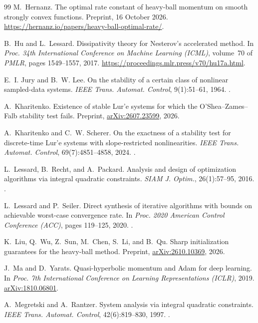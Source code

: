 \documentclass[11pt]{article}
\theoremstyle{definition}
\theoremstyle{remark}
\begin{document}
\begin{thebibliography}{99}
 M.~Hernanz. The optimal rate constant of heavy-ball momentum on smooth strongly convex functions. Preprint, 16 October 2026. \url{https://hernanz.io/papers/heavy-ball-optimal-rate/}.

 B.~Hu and L.~Lessard. Dissipativity theory for Nesterov's accelerated method. In \textit{Proc. 34th International Conference on Machine Learning (ICML)}, volume~70 of \textit{PMLR}, pages 1549--1557, 2017. \url{https://proceedings.mlr.press/v70/hu17a.html}.

 E.~I. Jury and B.~W. Lee. On the stability of a certain class of nonlinear sampled-data systems. \textit{IEEE Trans. Automat. Control}, 9(1):51--61, 1964. .

 A.~Kharitenko. Existence of stable Lur'e systems for which the O'Shea--Zames--Falb stability test fails. Preprint, \href{https://arxiv.org/abs/2607.23599}{arXiv:2607.23599}, 2026.

 A.~Kharitenko and C.~W. Scherer. On the exactness of a stability test for discrete-time Lur'e systems with slope-restricted nonlinearities. \textit{IEEE Trans. Automat. Control}, 69(7):4851--4858, 2024. .

 L.~Lessard, B.~Recht, and A.~Packard. Analysis and design of optimization algorithms via integral quadratic constraints. \textit{SIAM J. Optim.}, 26(1):57--95, 2016. .

 L.~Lessard and P.~Seiler. Direct synthesis of iterative algorithms with bounds on achievable worst-case convergence rate. In \textit{Proc. 2020 American Control Conference (ACC)}, pages 119--125, 2020. .

 K.~Liu, Q.~Wu, Z.~Sun, M.~Chen, S.~Li, and B.~Qu. Sharp initialization guarantees for the heavy-ball method. Preprint, \href{https://arxiv.org/abs/2610.10369}{arXiv:2610.10369}, 2026.

 J.~Ma and D.~Yarats. Quasi-hyperbolic momentum and Adam for deep learning. In \textit{Proc. 7th International Conference on Learning Representations (ICLR)}, 2019. \href{https://arxiv.org/abs/1810.06801}{arXiv:1810.06801}.

 A.~Megretski and A.~Rantzer. System analysis via integral quadratic constraints. \textit{IEEE Trans. Automat. Control}, 42(6):819--830, 1997. .


\end{thebibliography}
\end{document}
